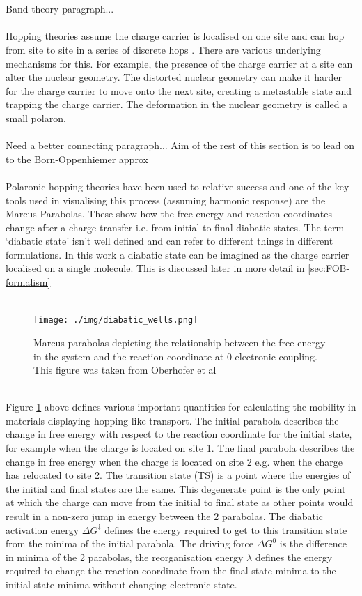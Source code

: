 \\\\
{\LARGE Band theory paragraph...}
\\\\
Hopping theories assume the charge carrier is localised on one site and can hop from site to site in a series of discrete hops \cite{oberhofer_charge_2017}. There are various underlying mechanisms for this. For example, the presence of the charge carrier at a site can alter the nuclear geometry. The distorted nuclear geometry can make it harder for the charge carrier to move onto the next site, creating a metastable state and trapping the charge carrier. The deformation in the nuclear geometry is called a small polaron.
\\\\
{\LARGE Need a better connecting paragraph... Aim of the rest of this section is to lead on to the Born-Oppenhiemer approx}
\\\\
Polaronic hopping theories have been used to relative success and one of the key tools used in visualising this process (assuming harmonic response) are the Marcus Parabolas. These show how the free energy and reaction coordinates change after a charge transfer i.e. from initial to final diabatic states. The term `diabatic state' isn't well defined and can refer to different things in different formulations. In this work a diabatic state can be imagined as the charge carrier localised on a single molecule. This is discussed later in more detail in  \ref{sec:FOB-formalism}\\
\\
\begin{figure}[ht]
  \texttt{[image: ./img/diabatic\_wells.png]}
  \caption{Marcus parabolas depicting the relationship between the free energy in the system and the reaction coordinate at 0 electronic coupling. This figure was taken from Oberhofer et al \cite{oberhofer_charge_2017}}
  \label{fig:diab_wells}
\end{figure}
\\
Figure \ref{fig:diab_wells} above defines various important quantities for calculating the mobility in materials displaying hopping-like transport. The initial parabola describes the change in free energy with respect to the reaction coordinate for the initial state, for example when the charge is located on site 1. The final parabola describes the change in free energy when the charge is located on site 2 e.g. when the charge has relocated to site 2. The transition state (TS) is a point where the energies of the initial and final states are the same. This degenerate point is the only point at which the charge can move from the initial to final state as other points would result in a non-zero jump in energy between the 2 parabolas. The diabatic activation energy $\Delta G^{\ddagger}$ defines the energy required to get to this transition state from the minima of the initial parabola. The driving force $\Delta G^{0}$ is the difference in minima of the 2 parabolas, the reorganisation energy $\lambda$ defines the energy required to change the reaction coordinate from the final state minima to the initial state minima without changing electronic state.
